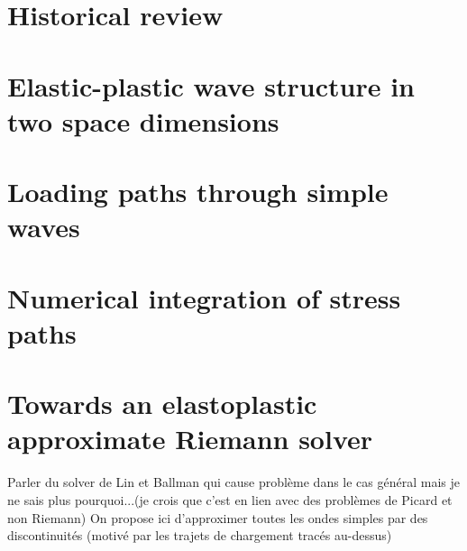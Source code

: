 \section{Historical review}
\label{sec:review}


\section{Elastic-plastic wave structure in two space dimensions}
\label{sec:charac_plast}


\section{Loading paths through simple waves}
\label{sec:stress_paths}



\section{Numerical integration of stress paths}
\label{sec:stress_paths_num}


\section{Towards an elastoplastic approximate Riemann solver}
\label{sec:ep_Riemman_solver}

Parler du solver de Lin et Ballman qui cause problème dans le cas général mais je ne sais plus pourquoi...(je crois que c'est en lien avec des problèmes de Picard et non Riemann)
On propose ici d'approximer toutes les ondes simples par des discontinuités (motivé par les trajets de chargement tracés au-dessus)
\cite{Lin_et_Ballman}
